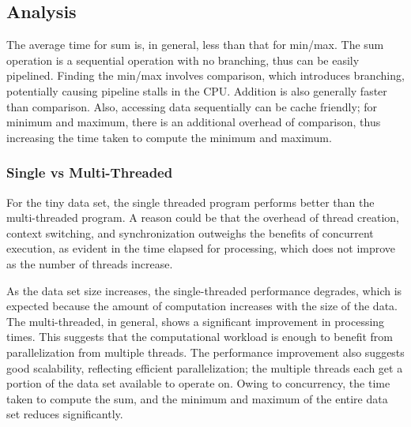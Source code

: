 \documentclass{article}
\theoremstyle{mytheoremstyle}
\theoremstyle{mytheoremstyle}
\theoremstyle{myproblemstyle}
\begin{document}
\subsection{Analysis}
The average time for sum is, in general, less than that for min/max. The sum operation is a sequential operation with no branching, thus can be easily pipelined. Finding the min/max involves comparison, which introduces branching, potentially causing pipeline stalls in the CPU. Addition is also generally faster than comparison. Also, accessing data sequentially can be cache friendly; for minimum and maximum, there is an additional overhead of comparison, thus increasing the time taken to compute the minimum and maximum.

\subsubsection*{Single vs Multi-Threaded}
For the tiny data set, the single threaded program performs better than the multi-threaded program. A reason could be that the overhead of thread creation, context switching, and synchronization outweighs the benefits of concurrent execution, as evident in the time elapsed for processing, which does not improve as the number of threads increase.

As the data set size increases, the single-threaded performance degrades, which is expected because the amount of computation increases with the size of the data. The multi-threaded, in general, shows a significant improvement in processing times. This suggests that the computational workload is enough to benefit from parallelization from multiple threads. The performance improvement also suggests good scalability, reflecting efficient parallelization; the multiple threads each get a portion of the data set available to operate on. Owing to concurrency, the time taken to compute the sum, and the minimum and maximum of the entire data set reduces significantly.
\end{document}

